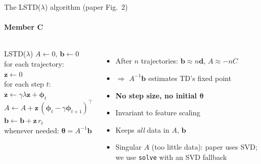 \documentclass[aspectratio=169,11pt]{beamer}
\newcommand{\memberC}{Member C}
\newcommand{\speaker}[1]{\framesubtitle{#1}}
\newcommand{\hl}[1]{\textcolor{accent}{\textbf{#1}}}
\newcommand{\vphi}{\bm{\phi}}
\newcommand{\vz}{\mathbf{z}}
\newcommand{\vth}{\bm{\theta}}
\begin{document}
\begin{frame}{The LSTD($\lambda$) algorithm (paper Fig.~2)}
  \speaker{\memberC}
  \begin{columns}[T]
    \begin{block}{LSTD($\lambda$)}
      \small
      $A \leftarrow 0$, $\mathbf{b} \leftarrow 0$\\
      for each trajectory:\\
      \quad $\vz \leftarrow 0$\\
      \quad for each step $t$:\\
      \qquad $\vz \leftarrow \gamma\lambda\vz + \vphi_t$\\
      \qquad $A \leftarrow A + \vz\,(\vphi_t - \gamma\vphi_{t+1})^\top$\\
      \qquad $\mathbf{b} \leftarrow \mathbf{b} + \vz\, r_t$\\
      whenever needed: $\vth = A^{-1}\mathbf{b}$
    \end{block}
    \begin{itemize}
      \item After $n$ trajectories: $\mathbf{b}\approx n\mathbf{d}$, $A \approx -nC$
      \item $\Rightarrow$ $A^{-1}\mathbf{b}$ estimates TD's fixed point
      \item \hl{No step size, no initial $\vth$}
      \item Invariant to feature scaling
      \item Keeps \emph{all} data in $A$, $\mathbf{b}$
      \item Singular $A$ (too little data): paper uses SVD; we use \texttt{solve} with an SVD fallback
    \end{itemize}
  \end{columns}
\end{frame}
\end{document}
